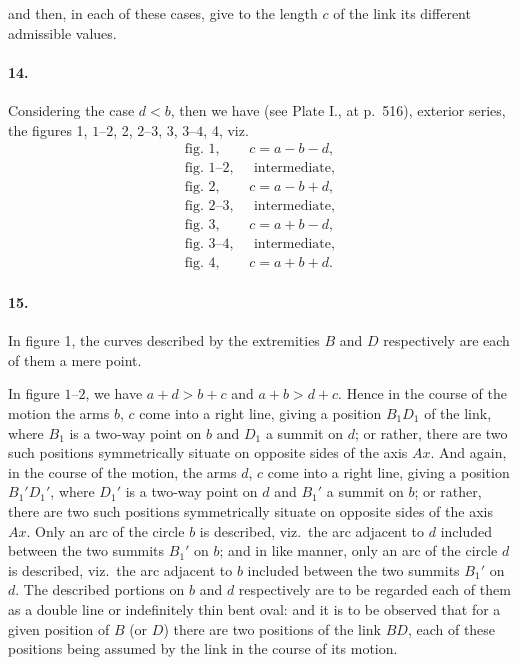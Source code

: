 \documentclass[11pt,a4paper]{article}
\theoremstyle{plain}
\begin{document}
and then, in each of these cases, give to the length $c$ of the link its different admissible values.

\paragraph{14.} Considering the case $d < b$, then we have (see Plate I., at p.~516), exterior series, the figures 1, $1\text{--}2$, 2, $2\text{--}3$, 3, $3\text{--}4$, 4, viz.
\begin{align*}
\text{fig.~1, } & c = a - b - d,\\
\text{fig.~$1\text{--}2$, } & \text{ intermediate},\\
\text{fig.~2, } & c = a - b + d,\\
\text{fig.~$2\text{--}3$, } & \text{ intermediate},\\
\text{fig.~3, } & c = a + b - d,\\
\text{fig.~$3\text{--}4$, } & \text{ intermediate},\\
\text{fig.~4, } & c = a + b + d.
\end{align*}

\paragraph{15.} In figure 1, the curves described by the extremities $B$ and $D$ respectively are each of them a mere point.

In figure $1\text{--}2$, we have $a + d > b + c$ and $a + b > d + c$. Hence in the course of the motion the arms $b$, $c$ come into a right line, giving a position $B_1D_1$ of the link, where $B_1$ is a two-way point on $b$ and $D_1$ a summit on $d$; or rather, there are two such positions symmetrically situate on opposite sides of the axis $Ax$. And again, in the course of the motion, the arms $d$, $c$ come into a right line, giving a position $B_1'D_1'$, where $D_1'$ is a two-way point on $d$ and $B_1'$ a summit on $b$; or rather, there are two such positions symmetrically situate on opposite sides of the axis $Ax$. Only an arc of the circle $b$ is described, viz.~the arc adjacent to $d$ included between the two summits $B_1'$ on $b$; and in like manner, only an arc of the circle $d$ is described, viz.~the arc adjacent to $b$ included between the two summits $B_1'$ on $d$. The described portions on $b$ and $d$ respectively are to be regarded each of them as a double line or indefinitely thin bent oval: and it is to be observed that for a given position of $B$ (or $D$) there are two positions of the link $BD$, each of these positions being assumed by the link in the course of its motion.
\end{document}
